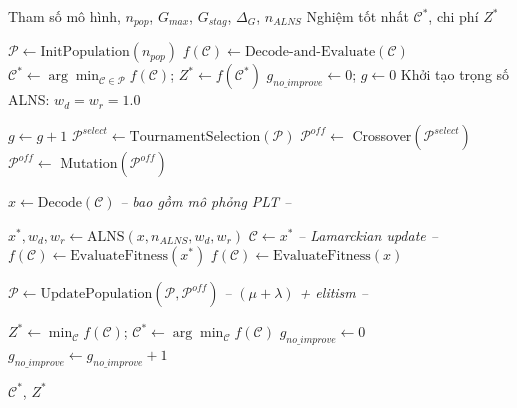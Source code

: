 \begin{algorithm}[H]
\caption{Hybrid GA--ALNS}
\label{alg:hybrid}
\begin{algorithmic}[1]
\Require Tham số mô hình, $n_{pop}$, $G_{max}$, $G_{stag}$, $\Delta_G$, $n_{ALNS}$
\Ensure Nghiệm tốt nhất $\mathcal{C}^*$, chi phí $Z^*$

\State $\mathcal{P} \gets \text{InitPopulation}(n_{pop})$ 
  \State $f(\mathcal{C}) \gets \text{Decode-and-Evaluate}(\mathcal{C})$ 
\EndFor
\State $\mathcal{C}^* \gets \arg\min_{\mathcal{C} \in \mathcal{P}} f(\mathcal{C})$; \; $Z^* \gets f(\mathcal{C}^*)$
\State $g_{no\_improve} \gets 0$; \; $g \gets 0$
\State Khởi tạo trọng số ALNS: $w_d = w_r = 1.0$

  \State $g \gets g + 1$
  \State $\mathcal{P}^{select} \gets \text{TournamentSelection}(\mathcal{P})$ 
  \State $\mathcal{P}^{off} \gets $ Crossover$(\mathcal{P}^{select})$ 
  \State $\mathcal{P}^{off} \gets $ Mutation$(\mathcal{P}^{off})$ 

    \State $x \gets \text{Decode}(\mathcal{C})$ \quad \textit{-- bao gồm mô phỏng PLT --}
    
      \State $x^*, w_d, w_r \gets \text{ALNS}(x, n_{ALNS}, w_d, w_r)$ 
      \State $\mathcal{C} \gets x^*$ \quad \textit{-- Lamarckian update --}
      \State $f(\mathcal{C}) \gets \text{EvaluateFitness}(x^*)$
    \Else
      \State $f(\mathcal{C}) \gets \text{EvaluateFitness}(x)$
    \EndIf
  \EndFor

  \State $\mathcal{P} \gets \text{UpdatePopulation}(\mathcal{P}, \mathcal{P}^{off})$ \quad \textit{-- $(\mu+\lambda)$ + elitism --}

    \State $Z^* \gets \min_{\mathcal{C}} f(\mathcal{C})$; \; $\mathcal{C}^* \gets \arg\min_{\mathcal{C}} f(\mathcal{C})$
    \State $g_{no\_improve} \gets 0$
  \Else
    \State $g_{no\_improve} \gets g_{no\_improve} + 1$
  \EndIf
\EndWhile

\State \Return $\mathcal{C}^*$, $Z^*$

\end{algorithmic}
\end{algorithm}

